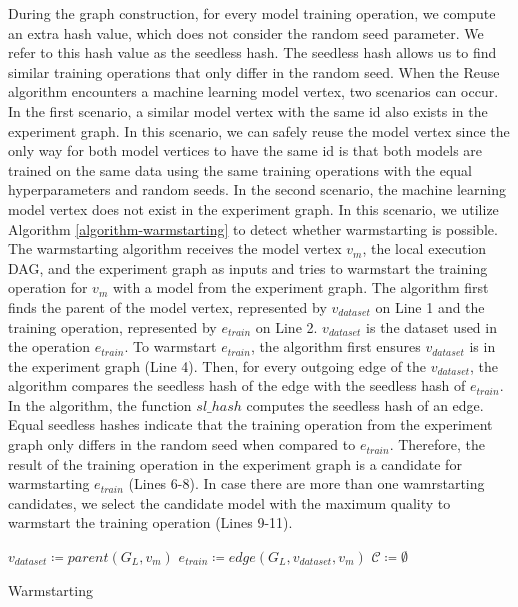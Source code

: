 During the graph construction, for every model training operation, we compute an extra hash value, which does not consider the random seed parameter.
We refer to this hash value as the seedless hash.
The seedless hash allows us to find similar training operations that only differ in the random seed.
When the Reuse algorithm encounters a machine learning model vertex, two scenarios can occur.
In the first scenario, a similar model vertex with the same id also exists in the experiment graph. 
In this scenario, we can safely reuse the model vertex since the only way for both model vertices to have the same id is that both models are trained on the same data using the same training operations with the equal hyperparameters and random seeds.
In the second scenario, the machine learning model vertex does not exist in the experiment graph.
In this scenario, we utilize Algorithm \ref{algorithm-warmstarting} to detect whether warmstarting is possible.
The warmstarting algorithm receives the model vertex $v_m$, the local execution DAG, and the experiment graph as inputs and tries to warmstart the training operation for $v_m$ with a model from the experiment graph.
The algorithm first finds the parent of the model vertex, represented by $v_{dataset}$ on Line 1 and the training operation, represented by $e_{train}$ on Line 2.
$v_{dataset}$ is the dataset used in the operation $e_{train}$.
To warmstart $e_{train}$, the algorithm first ensures $v_{dataset}$ is in the experiment graph (Line 4).
Then, for every outgoing edge of the $v_{dataset}$, the algorithm compares the seedless hash of the edge with the seedless hash of $e_{train}$.
In the algorithm, the function $sl\_hash$ computes the seedless hash of an edge.
Equal seedless hashes indicate that the training operation from the experiment graph only differs in the random seed when compared to $e_{train}$.
Therefore, the result of the training operation in the experiment graph is a candidate for warmstarting $e_{train}$ (Lines 6-8).
In case there are more than one wamrstarting candidates, we select the candidate model with the maximum quality to warmstart the training operation (Lines 9-11).
\begin{algorithm}[h]
$v_{dataset} \coloneqq parent(G_L, v_m)$\;
$e_{train} \coloneqq edge(G_L, v_{dataset}, v_m)$\;
$\mathcal{C}\coloneqq \emptyset$
\caption{Warmstarting}\label{algorithm-warmstarting}
\end{algorithm}